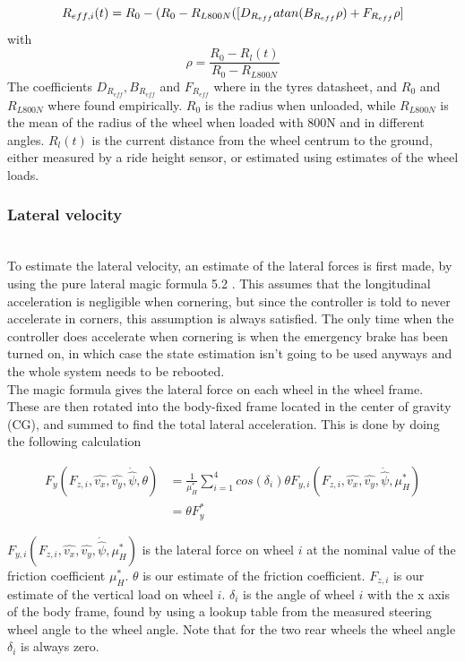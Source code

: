 \begin{equation}
    R_{eff,i}(t) = R_0 - (R_0-R_{L800N}([D_{R_{eff}}atan(B_{R_{eff}}\rho) + \\ F_{R_{eff}}\rho]
\end{equation}
with
\begin{equation}
    \rho = \frac{R_0-R_l(t)}{R_0-R_{L800N}}
\end{equation}
The coefficients $D_{R_{eff}}, B_{R_{eff}}$ and $F_{R_{eff}}$ where in the tyres datasheet, and $R_0$ and $R_{L800N}$ where found empirically. $R_0$ is the radius when unloaded, while $R_{L800N}$ is the mean of the radius of the wheel when loaded with 800N and in different angles. $R_l(t)$ is the current distance from the wheel centrum to the ground, either measured by a ride height sensor, or estimated using estimates of the wheel loads.

\subsubsection{Lateral velocity} \\
To estimate the lateral velocity, an estimate of the lateral forces is first made, by using the pure lateral magic formula 5.2 \cite{MagicFormula5_2}. This assumes that the longitudinal acceleration is negligible when cornering, but since the controller is told to never accelerate in corners, this assumption is always satisfied. The only time when the controller does accelerate when cornering is when the emergency brake has been turned on, in which case the state estimation isn't going to be used anyways and the whole system needs to be rebooted. \\ 

The magic formula gives the lateral force on each wheel in the wheel frame. These are then rotated into the body-fixed frame located in the center of gravity (CG), and summed to find the total lateral acceleration. This is done by doing the following calculation

\begin{align}
    F_y(F_{z,i},\hat{v_x},\hat{v_y},\dot{\hat{\psi}}, \theta) & = \frac{1}{\mu_{H}^{*}}\sum_{i=1}^{4}cos(\delta_i)\theta F_{y,i}(F_{z,i},\hat{v_x},\hat{v_y},\dot{\hat{\psi}}, \mu_{H}^{*}) \\
    & =  \theta F_y^{*}
\end{align}

$F_{y,i}(F_{z,i},\hat{v_x},\hat{v_y},\dot{\hat{\psi}}, \mu_{H}^{*})$ is the lateral force on wheel $i$ at the nominal value of the friction coefficient $\mu_{H}^{*}$. $\theta$ is our estimate of the friction coefficient. $F_{z,i}$ is our estimate of the vertical load on wheel $i$. $\delta_i$ is the angle of wheel $i$ with the x axis of the body frame, found by using a lookup table from the measured steering wheel angle to the wheel angle. Note that for the two rear wheels the wheel angle $\delta_i$ is always zero. \\ 

